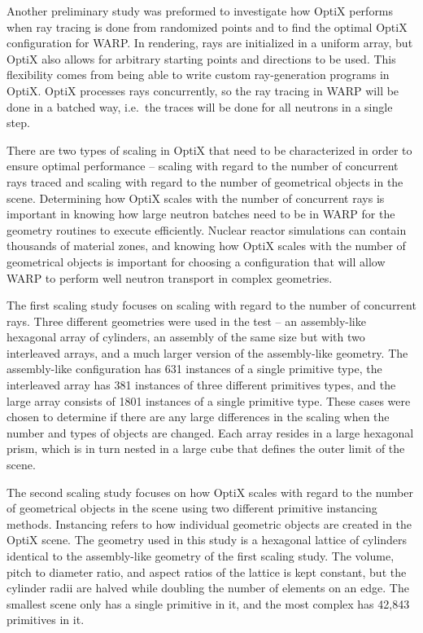 Another preliminary study was preformed to investigate how OptiX performs when ray tracing is done from randomized points and to find the optimal OptiX configuration for WARP.  In rendering, rays are initialized in a uniform array, but OptiX also allows for arbitrary starting points and directions to be used.  This flexibility comes from being able to write custom ray-generation programs in OptiX.  OptiX processes rays concurrently, so the ray tracing in WARP will be done in a batched way, i.e.\ the traces will be done for all neutrons in a single step.

There are two types of scaling in OptiX that need to be characterized in order to ensure optimal performance -- scaling with regard to the number of concurrent rays traced and scaling with regard to the number of geometrical objects in the scene.  Determining how OptiX scales with the number of concurrent rays is important in knowing how large neutron batches need to be in WARP for the geometry routines to execute efficiently.  Nuclear reactor simulations can contain thousands of material zones, and knowing how OptiX scales with the number of geometrical objects is important for choosing a configuration that will allow WARP to perform well neutron transport in complex geometries.  

The first scaling study focuses on scaling with regard to the number of concurrent rays. Three different geometries were used in the test -- an assembly-like hexagonal array of cylinders, an assembly of the same size but with two interleaved arrays, and a much larger version of the assembly-like geometry.  The assembly-like configuration has 631 instances of a single primitive type, the interleaved array has 381 instances of three different primitives types, and the large array consists of 1801 instances of a single primitive type.  These cases were chosen to determine if there are any large differences in the scaling when the number and types of objects are changed.  Each array resides in a large hexagonal prism, which is in turn nested in a large cube that defines the outer limit of the scene.

The second scaling study focuses on how OptiX scales with regard to the number of geometrical objects in the scene using two different primitive instancing methods.  Instancing refers to how individual geometric objects are created in the OptiX scene.  The geometry used in this study is a hexagonal lattice of cylinders identical to the assembly-like geometry of the first scaling study.  The volume, pitch to diameter ratio, and aspect ratios of the lattice is kept constant, but the cylinder radii are halved while doubling the number of elements on an edge.  The smallest scene only has a single primitive in it, and the most complex has 42,843 primitives in it.  


